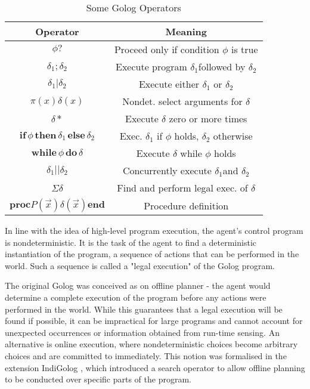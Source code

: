 \documentclass[letterpaper]{article}
\begin{document}
\begin{table}[hbt]
\begin{center}\begin{tabular}{|c|c|}
\hline 
Operator&
Meaning\tabularnewline
\hline
\hline 
$\phi?$&
Proceed only if condition $\phi$ is true\tabularnewline
\hline 
$\delta_{1};\delta_{2}$&
Execute program $\delta_{1}$followed by $\delta_{2}$\tabularnewline
\hline 
$\delta_{1}|\delta_{2}$&
Execute either $\delta_{1}$ or $\delta_{2}$\tabularnewline
\hline 
$\pi(x)\delta(x)$&
Nondet. select arguments for $\delta$\tabularnewline
\hline 
$\delta*$&
Execute $\delta$ zero or more times\tabularnewline
\hline 
$\mathbf{if}\,\phi\,\mathbf{then}\,\delta_{1}\,\mathbf{else}\,\delta_{2}$&
Exec. $\delta_{1}$ if $\phi$ holds, $\delta_{2}$ otherwise\tabularnewline
\hline 
$\mathbf{while\,}\phi\mathbf{\, do}\,\delta$&
Execute $\delta$ while $\phi$ holds\tabularnewline
\hline 
$\delta_{1}||\delta_{2}$&
Concurrently execute $\delta_{1}$and $\delta_{2}$\tabularnewline
\hline 
$\Sigma\delta$&
Find and perform legal exec. of $\delta$\tabularnewline
\hline 
$\mathbf{proc}P(\overrightarrow{x})\delta(\overrightarrow{x})\mathbf{end}$&
Procedure definition\tabularnewline
\hline
\end{tabular}\end{center}


\caption{Some Golog Operators\label{tbl:Golog-Operators}}
\end{table}


In line with the idea of high-level program execution, the agent's
control program is nondeterministic. It is the task of the agent to
find a deterministic instantiation of the program, a sequence of actions
that can be performed in the world. Such a sequence is called a "legal
execution" of the Golog program.

The original Golog was conceived as on offline planner - the agent
would determine a complete execution of the program before any actions
were performed in the world. While this guarantees that a legal execution
will be found if possible, it can be impractical for large programs
and cannot account for unexpected occurrences or information obtained
from run-time sensing. An alternative is online execution, where nondeterministic
choices become arbitrary choices and are committed to immediately.
This notion was formalised in the extension IndiGolog \cite{giacomo99indigolog},
which introduced a search operator to allow offline planning to be
conducted over specific parts of the program.
\end{document}
